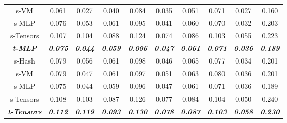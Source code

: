 \documentclass[letterpaper]{article} \usepackage{aaai23}  \usepackage{times}  \usepackage{helvet}  \usepackage{courier}  \usepackage[hyphens]{url}  \usepackage{graphicx} \urlstyle{rm} \def\UrlFont{\rm}  \usepackage{natbib}  \usepackage{caption} \frenchspacing  \setlength{\pdfpagewidth}{8.5in}  \setlength{\pdfpageheight}{11in}  \usepackage{multirow}
\begin{document}
\begin{table*}[t]
{\begin{tabular}{c|ccccccccc}
s-VM                        & 0.061                   & 0.027                   & 0.040                   & 0.084                   & 0.035                   & 0.051                   & 0.071                   & 0.027                   & 0.160                   \\
s-MLP                       & 0.076                   & 0.053                   & 0.061                   & 0.095                   & 0.041                   & 0.060                   & 0.070                   & 0.032                   & 0.203                   \\
s-Tensors                   & 0.107                   & 0.104                   & 0.088                   & 0.124                   & 0.074                   & 0.086                   & 0.103                   & 0.055                   & 0.223                   \\ \hline
\textit{\textbf{t-MLP}}     & \textit{\textbf{0.075}} & \textit{\textbf{0.044}} & \textit{\textbf{0.059}} & \textit{\textbf{0.096}} & \textit{\textbf{0.047}} & \textit{\textbf{0.061}} & \textit{\textbf{0.071}} & \textit{\textbf{0.036}} & \textit{\textbf{0.189}} \\ \hline
s-Hash                      & 0.079                   & 0.056                   & 0.061                   & 0.098                   & 0.046                   & 0.065                   & 0.077                   & 0.034                   & 0.201                   \\
s-VM                        & 0.079                   & 0.047                   & 0.061                   & 0.097                   & 0.051                   & 0.063                   & 0.080                   & 0.036                   & 0.201                   \\
s-MLP                       & 0.075                   & 0.044                   & 0.059                   & 0.096                   & 0.047                   & 0.061                   & 0.071                   & 0.036                   & 0.189                   \\
s-Tensors                   & 0.108                   & 0.103                   & 0.087                   & 0.126                   & 0.077                   & 0.084                   & 0.104                   & 0.050                   & 0.240                   \\ \hline
\textit{\textbf{t-Tensors}} & \textit{\textbf{0.112}} & \textit{\textbf{0.119}} & \textit{\textbf{0.093}} & \textit{\textbf{0.130}} & \textit{\textbf{0.078}} & \textit{\textbf{0.087}} & \textit{\textbf{0.103}} & \textit{\textbf{0.058}} & \textit{\textbf{0.230}} \\ \hline

\end{tabular}}
\end{table*}
\end{document}
